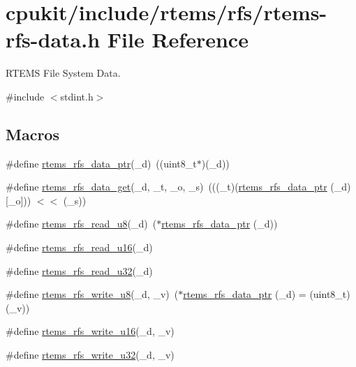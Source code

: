 \hypertarget{rtems-rfs-data_8h}{}\section{cpukit/include/rtems/rfs/rtems-\/rfs-\/data.h File Reference}
\label{rtems-rfs-data_8h}


R\+T\+E\+MS File System Data.  


{\ttfamily \#include $<$stdint.\+h$>$}\newline
\subsection*{Macros}
\begin{DoxyCompactItemize}
\item 
\#define \mbox{\hyperlink{rtems-rfs-data_8h_a5fbf9f5b7233acca6b58f1208cd16aff}{rtems\+\_\+rfs\+\_\+data\+\_\+ptr}}(\+\_\+d)~((uint8\+\_\+t$\ast$)(\+\_\+d))
\item 
\#define \mbox{\hyperlink{rtems-rfs-data_8h_a0640dfd9b9ad52e3f44e7c7d387f5f4e}{rtems\+\_\+rfs\+\_\+data\+\_\+get}}(\+\_\+d,  \+\_\+t,  \+\_\+o,  \+\_\+s)~(((\+\_\+t)(\mbox{\hyperlink{rtems-rfs-data_8h_a5fbf9f5b7233acca6b58f1208cd16aff}{rtems\+\_\+rfs\+\_\+data\+\_\+ptr}} (\+\_\+d)\mbox{[}\+\_\+o\mbox{]})) $<$$<$ (\+\_\+s))
\item 
\#define \mbox{\hyperlink{rtems-rfs-data_8h_a1298278435124732c348900b51d360b6}{rtems\+\_\+rfs\+\_\+read\+\_\+u8}}(\+\_\+d)~($\ast$\mbox{\hyperlink{rtems-rfs-data_8h_a5fbf9f5b7233acca6b58f1208cd16aff}{rtems\+\_\+rfs\+\_\+data\+\_\+ptr}} (\+\_\+d))
\item 
\#define \mbox{\hyperlink{rtems-rfs-data_8h_a602400ac127a6614ac1e16f322df3f0b}{rtems\+\_\+rfs\+\_\+read\+\_\+u16}}(\+\_\+d)
\item 
\#define \mbox{\hyperlink{rtems-rfs-data_8h_ae061f1784ebeef490293e0080740041a}{rtems\+\_\+rfs\+\_\+read\+\_\+u32}}(\+\_\+d)
\item 
\#define \mbox{\hyperlink{rtems-rfs-data_8h_aa25c4570444444952479782563962983}{rtems\+\_\+rfs\+\_\+write\+\_\+u8}}(\+\_\+d,  \+\_\+v)~($\ast$\mbox{\hyperlink{rtems-rfs-data_8h_a5fbf9f5b7233acca6b58f1208cd16aff}{rtems\+\_\+rfs\+\_\+data\+\_\+ptr}} (\+\_\+d) = (uint8\+\_\+t)(\+\_\+v))
\item 
\#define \mbox{\hyperlink{rtems-rfs-data_8h_a7f9da284acf36ff50739fd3fd252f210}{rtems\+\_\+rfs\+\_\+write\+\_\+u16}}(\+\_\+d,  \+\_\+v)
\item 
\#define \mbox{\hyperlink{rtems-rfs-data_8h_a0e7b57b15dac03868caaeb7d2c8c1ba7}{rtems\+\_\+rfs\+\_\+write\+\_\+u32}}(\+\_\+d,  \+\_\+v)
\end{DoxyCompactItemize}


